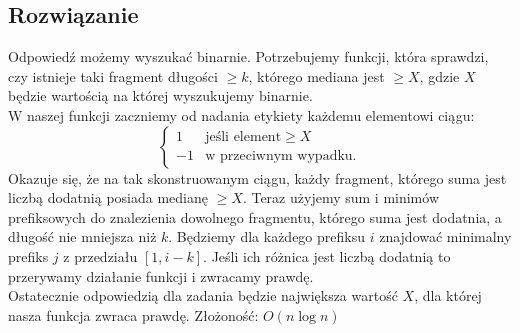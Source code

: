 \documentclass[10pt]{article}
\begin{document}
\subsection{Rozwiązanie}
Odpowiedź możemy wyszukać binarnie. Potrzebujemy funkcji, która sprawdzi, czy istnieje taki fragment długości $\geq k$, którego mediana jest $\geq X$, gdzie $X$ będzie wartością na której wyszukujemy binarnie.
\\ W naszej funkcji zaczniemy od nadania etykiety każdemu elementowi ciągu:
$$
\begin{cases}
	1 & \text{jeśli element} \geq X \\
	-1 & \text{w przeciwnym wypadku.}
\end{cases}
$$
Okazuje się, że na tak skonstruowanym ciągu, każdy fragment, którego suma jest liczbą dodatnią posiada medianę $\geq X$. Teraz użyjemy sum i minimów prefiksowych do znalezienia dowolnego fragmentu, którego suma jest dodatnia, a długość nie mniejsza niż $k$. Będziemy dla każdego prefiksu $i$ znajdować minimalny prefiks $j$ z przedziału $[1,i-k]$. Jeśli ich różnica jest liczbą dodatnią to przerywamy działanie funkcji i zwracamy prawdę.
\\ Ostatecznie odpowiedzią dla zadania będzie największa wartość $X$, dla której nasza funkcja zwraca prawdę. Złożoność: $O(n\log{}n)$
\end{document}
